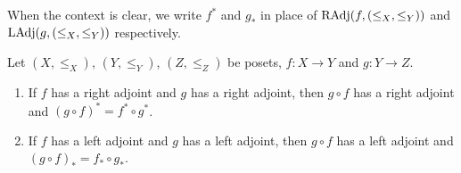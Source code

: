 \documentclass{book}
\begin{document}
	\begin{note}
		When the context is clear, we write $f^*$ and $g_*$ in place of $\operatorname{RAdj}(f, (\leq_X, \leq_Y))$ and $\operatorname{LAdj}(g, (\leq_X, \leq_Y))$ respectively.
	\end{note}
	
	\begin{ex} 
		Let $(X, \leq_X)$, $(Y, \leq_Y)$, $(Z, \leq_Z)$ be posets, $f: X \rightarrow Y$ and $g:Y \rightarrow Z$. 
		\begin{enumerate}
			\item If $f$ has a right adjoint and $g$ has a right adjoint, then $g \circ f$ has a right adjoint and $(g \circ f)^* = f^* \circ g^*$.
			\item If $f$ has a left adjoint and $g$ has a left adjoint, then $g \circ f$ has a left adjoint and $(g \circ f)_* = f_* \circ g_*$.
		\end{enumerate}
	\end{ex}
	
\end{document}
